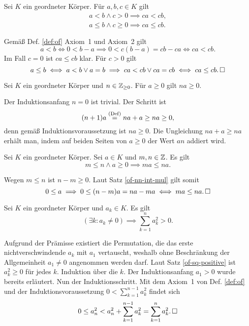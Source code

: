 \begin{Satz}\label{of-ineq-mul}
Sei $K$ ein geordneter Körper. Für $a,b,c\in K$ gilt
\begin{gather*}
a<b\land c>0\implies ca<cb,\\
a\le b\land c\ge 0\implies ca\le cb.
\end{gather*}
\end{Satz}
\begin{Beweis}
Gemäß Def. \ref{def:of} Axiom~1 und Axiom~2 gilt
\[a<b\iff 0<b-a \implies 0<c(b-a) = cb-ca\iff ca<cb.\]
Im Fall $c=0$ ist $ca\le cb$ klar. Für $c>0$ gilt
\[a\le b\iff a<b\lor a=b\implies ca<cb\lor ca=cb\iff ca\le cb.\,\square\]
\end{Beweis}

\begin{Satz}\label{of-nn-int-mul}
Sei $K$ ein geordneter Körper und $n\in\mathbb Z_{\ge 0}$. Für $a\ge 0$ gilt
$na\ge 0$.
\end{Satz}
\begin{Beweis} Der Induktionsanfang $n=0$ ist trivial. Der Schritt ist
\[(n+1)a \stackrel{\mathrm{(Def)}}{=} na+a \ge na \ge 0,\]
denn gemäß Induktionsvoraussetzung ist $na\ge 0$. Die Ungleichung
$na+a\ge na$ erhält man, indem auf beiden Seiten von
$a\ge 0$ der Wert $an$ addiert wird.\,\qedsymbol
\end{Beweis}

\begin{Satz}
Sei $K$ ein geordneter Körper. Sei $a\in K$ und $m,n\in\mathbb Z$.
Es gilt
\[m\le n\land a\ge 0\implies ma\le na.\]
\end{Satz}
\begin{Beweis}
Wegen $m\le n$ ist $n-m\ge 0$. Laut Satz \ref{of-nn-int-mul}
gilt somit
\[0\le a \implies 0\le (n-m)a = na-ma\iff ma\le na.\,\square\]
\end{Beweis}

\begin{Satz}\label{of-sum-of-sq-positive}
Sei $K$ ein geordneter Körper und $a_k\in K$. Es gilt
\[\textstyle (\exists k\colon a_k\ne 0)\implies \sum_{k=1}^n a_k^2 > 0.\]
\end{Satz}
\begin{Beweis}
Aufgrund der Prämisse existiert die Permutation, die das
erste nichtverschwindende $a_k$ mit $a_1$ vertauscht, weshalb ohne
Beschränkung der Allgemeinheit $a_1\ne 0$ angenommen werden darf.
Laut Satz \ref{of-sq-positive} ist $a_k^2\ge 0$ für jedes $k$.
Induktion über die $k$. Der Induktionsanfang $a_1>0$ wurde bereits
erläutert. Nun der Induktionsschritt. Mit dem Axiom~1 von Def. \ref{def:of}
und der Induktionsvoraussetzung $0 < \sum_{k=1}^{n-1} a_k^2$ findet sich
\[0\le a_n^2 < a_n^2 + \sum_{k=1}^{n-1} a_k^2 = \sum_{k=1}^n a_k^2.\,\square\]
\end{Beweis}

